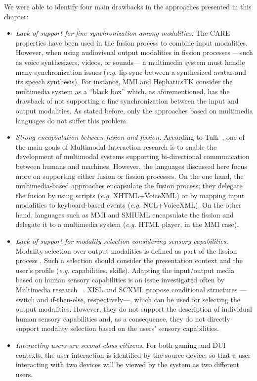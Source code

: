 \documentclass[
  doutorado,
  american
]{ThesisPUC}
\begin{document}
We were able to identify four main drawbacks in the approaches presented in this chapter:

\begin{itemize}	
	\item \textit{Lack of support for fine synchronization among modalities.} The
	CARE properties have been used in the fusion process to combine input
	modalities. However, when using audiovisual output modalities in fission
	processes —such as voice synthesizers, videos, or sounds— a multimedia system
	must handle many synchronization issues (\textit{e.g.} lip-sync between a synthesized
	avatar and its speech synthesis). For instance, MMI and HephaticsTK consider
	the multimedia system as a “black box” which, as aforementioned, has the
	drawback of not supporting a fine synchronization between the input and output
	modalities. As stated before, only the approaches based on multimedia
	languages do not suffer this problem.

	\item\textit{Strong encapsulation between fusion and fission.} According to
	Tulk~\cite{turk_multimodal_2014}, one of the main goals of Multimodal
	Interaction research is to enable the development of multimodal systems
	supporting bi-directional communication between humans and machines. However,
	the languages discussed here focus more on supporting either fusion or fission
	processes. On the one hand, the multimedia-based approaches encapsulate the
	fusion process; they delegate the fusion by using scripts (\textit{e.g.} XHTML+VoiceXML)
	or by mapping input modalities to keyboard-based events (\textit{e.g.} NCL+VoiceXML). On
	the other hand, languages such as MMI and SMIUML encapsulate the fission and
	delegate it to a multimedia system (\textit{e.g.} HTML player, in the MMI case). 
	
	\item \textit{Lack of support for modality selection considering sensory
	capabilities.} Modality selection over output modalities is defined as part of
	the fission process \cite{costa_adapting_2011,dumas_multimodal_2009}. 
	Such a selection should consider the
	presentation context and the user’s profile (\textit{e.g.} capabilities, 
	skills).
	Adapting the input/output media based on human sensory capabilities is an
	issue investigated often by Multimedia research
	~\cite{ghinea_mulsemedia:_2014}. XISL and SCXML propose conditional structures
	—switch and if-then-else, respectively—, which can be used for selecting the
	output modalities. However, they do not support the description of individual
	human sensory capabilities and, as a consequence, they do not directly support
	modality selection based on the users’ sensory capabilities.

	\item \textit{Interacting users are second-class citizens.} For both gaming
	and DUI contexts, the user interaction is identified by the source device, so
	that a user interacting with two devices will be viewed by the system as two
	different users.
\end{itemize}
\end{document}
